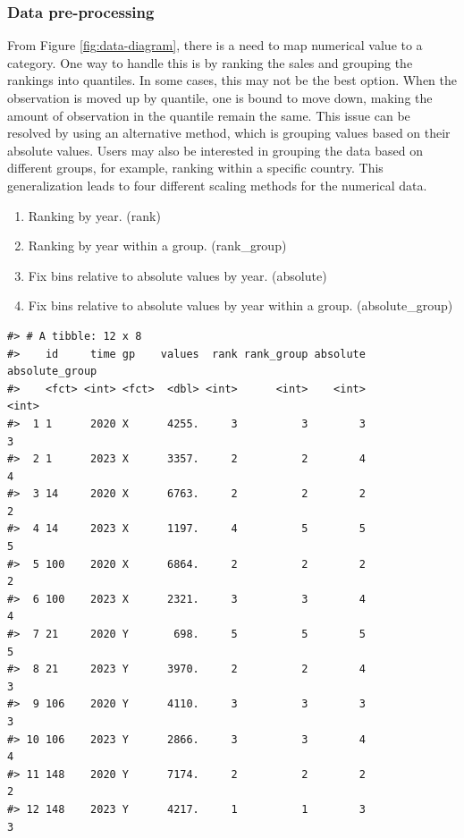 \hypertarget{data-pre-processing}{%
\subsubsection{Data pre-processing}\label{data-pre-processing}}

From Figure \ref{fig:data-diagram}, there is a need to map numerical value to a category. One way to handle this is by ranking the sales and grouping the rankings into quantiles. In some cases, this may not be the best option. When the observation is moved up by quantile, one is bound to move down, making the amount of observation in the quantile remain the same. This issue can be resolved by using an alternative method, which is grouping values based on their absolute values. Users may also be interested in grouping the data based on different groups, for example, ranking within a specific country. This generalization leads to four different scaling methods for the numerical data.

\begin{enumerate}
\def\labelenumi{\arabic{enumi}.}
\tightlist
\item
  Ranking by year. (rank)
\item
  Ranking by year within a group. (rank\_group)
\item
  Fix bins relative to absolute values by year. (absolute)
\item
  Fix bins relative to absolute values by year within a group. (absolute\_group)
\end{enumerate}

\begin{verbatim}
#> # A tibble: 12 x 8
#>    id     time gp    values  rank rank_group absolute absolute_group
#>    <fct> <int> <fct>  <dbl> <int>      <int>    <int>          <int>
#>  1 1      2020 X      4255.     3          3        3              3
#>  2 1      2023 X      3357.     2          2        4              4
#>  3 14     2020 X      6763.     2          2        2              2
#>  4 14     2023 X      1197.     4          5        5              5
#>  5 100    2020 X      6864.     2          2        2              2
#>  6 100    2023 X      2321.     3          3        4              4
#>  7 21     2020 Y       698.     5          5        5              5
#>  8 21     2023 Y      3970.     2          2        4              3
#>  9 106    2020 Y      4110.     3          3        3              3
#> 10 106    2023 Y      2866.     3          3        4              4
#> 11 148    2020 Y      7174.     2          2        2              2
#> 12 148    2023 Y      4217.     1          1        3              3
\end{verbatim}

